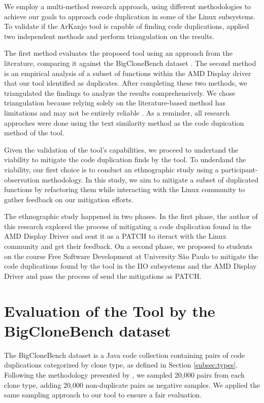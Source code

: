 We employ a multi-method research approach, using different methodologies to achieve our goals
to approach code duplication in some of the Linux subsystems. 
To validate if the ArKanjo tool is capable of finding code duplications, 
applied two independent methods and perform triangulation on the results. 

The first method evaluates the proposed tool using an approach from the literature, 
comparing it against the BigCloneBench dataset \citep{bigclonebench}. 
The second method is an empirical analysis of a subset of functions within the 
AMD Display driver that our tool identified as duplicates. After completing these two 
methods, we triangulated the findings to analyze the results comprehensively. 
We chose triangulation because relying solely on the literature-based method has 
limitations and may not be entirely reliable \citep{bigfail, litreview}. As a reminder, 
all research approches were done using the text similarity method as the 
code dupication method of the tool.

Given the validation of the tool's capabilities, we proceed to undertand the viability 
to mitigate the code duplication finds by the tool. 
To underdand the viability, our first choice is to conduct an ethnographic study using 
a participant-observation methodology. 
In this study, we aim to mitigate a subset of duplicated functions by refactoring them 
while interacting with the Linux community to gather feedback on our mitigation efforts. 

The ethnographic study happened in two phases. 
In the first phase, the author of this research explored the process of mitigating
a code duplication found in the AMD Display Driver and sent it as a PATCH to iteract with the
Linux community and get their feedback. On a second phase, we proposed to students on the 
course Free Software Development at University São Paulo to mitigate the code duplications found 
by the tool in the IIO subsystems and the AMD Display Driver and pass the process of send the mitigations as PATCH.

\section{Evaluation of the Tool by the BigCloneBench dataset}

\label{sec:metbig}

The BigCloneBench dataset \citep{bigclonebench} is a Java code collection containing pairs of code duplications categorized by clone type, as defined in Section \ref{subsec:types}.
%
Following the methodology presented by \citep{tailor}, we sampled 20,000 pairs from each clone type, adding 20,000 non-duplicate pairs as negative samples. We applied the same sampling approach to our tool to ensure a fair evaluation.

